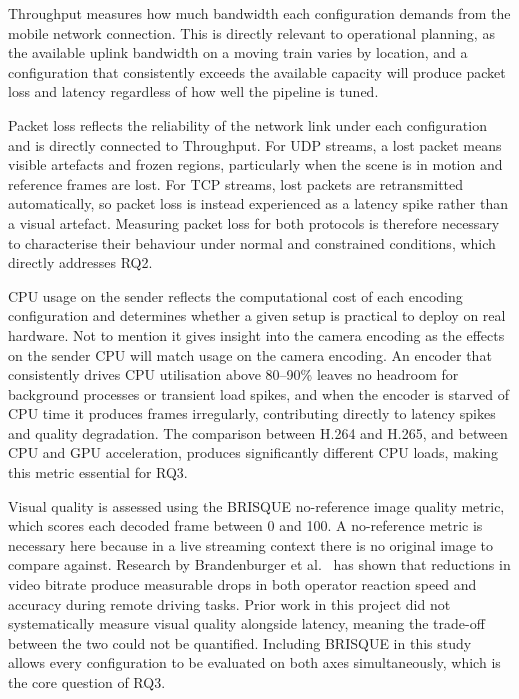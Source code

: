 Throughput measures how much bandwidth each configuration demands from the mobile network connection. This is directly relevant to operational planning, as the available uplink bandwidth on a moving train varies by location, and a configuration that consistently exceeds the available capacity will produce packet loss and latency regardless of how well the pipeline is tuned. 

Packet loss reflects the reliability of the network link under each configuration and is directly connected to Throughput. For UDP streams, a lost packet means visible artefacts and frozen regions, particularly when the scene is in motion and reference frames are lost. For TCP streams, lost packets are retransmitted automatically, so packet loss is instead experienced as a latency spike rather than a visual artefact. Measuring packet loss for both protocols is therefore necessary to characterise their behaviour under normal and constrained conditions, which directly addresses RQ2. 

CPU usage on the sender reflects the computational cost of each encoding configuration and determines whether a given setup is practical to deploy on real hardware. Not to mention it gives insight into the camera encoding as the effects on the sender CPU will match usage on the camera encoding. An encoder that consistently drives CPU utilisation above 80--90\% leaves no headroom for background processes or transient load spikes, and when the encoder is starved of CPU time it produces frames irregularly, contributing directly to latency spikes and quality degradation. The comparison between H.264 and H.265, and between CPU and GPU acceleration, produces significantly different CPU loads, making this metric essential for RQ3.

Visual quality is assessed using the BRISQUE no-reference image quality metric, which scores each decoded frame between 0 and 100. A no-reference metric is necessary here because in a live streaming context there is no original image to compare against. Research by Brandenburger et al.~\cite{brandenburger2023} has shown that reductions in video bitrate produce measurable drops in both operator reaction speed and accuracy during remote driving tasks. Prior work in this project did not systematically measure visual quality alongside latency, meaning the trade-off between the two could not be quantified. Including BRISQUE in this study allows every configuration to be evaluated on both axes simultaneously, which is the core question of RQ3.

